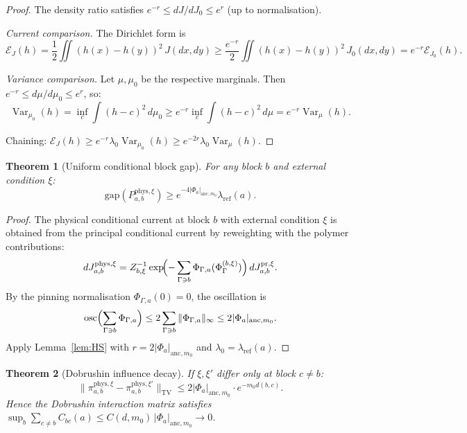 \documentclass[12pt]{article}
\theoremstyle{plain}
\newtheorem{theorem}{Theorem}[section]
\theoremstyle{definition}
\numberwithin{equation}{section}
\newcommand{\Var}{\operatorname{Var}}
\newcommand{\osc}{\operatorname{osc}}
\newcommand{\pr}{\mathrm{pr}}
\newcommand{\phys}{\mathrm{phys}}
\begin{document}
\begin{proof}
The density ratio satisfies $e^{-r}\leq dJ/dJ_0\leq e^r$ (up to normalisation).

\emph{Current comparison.}  The Dirichlet form is
\begin{equation}
\mathcal{E}_J(h) = \frac{1}{2}\iint(h(x)-h(y))^2\,J(dx,dy) \geq \frac{e^{-r}}{2}\iint(h(x)-h(y))^2\,J_0(dx,dy) = e^{-r}\mathcal{E}_{J_0}(h).
\end{equation}

\emph{Variance comparison.}  Let $\mu,\mu_0$ be the respective marginals.  Then $e^{-r}\leq d\mu/d\mu_0\leq e^r$, so:
\begin{equation}
\Var_{\mu_0}(h) = \inf_c\int(h-c)^2\,d\mu_0 \geq e^{-r}\inf_c\int(h-c)^2\,d\mu = e^{-r}\Var_\mu(h).
\end{equation}

Chaining: $\mathcal{E}_J(h)\geq e^{-r}\lambda_0\Var_{\mu_0}(h)\geq e^{-2r}\lambda_0\Var_\mu(h)$.
\end{proof}

\begin{theorem}[Uniform conditional block gap]\label{thm:conditionalgap}
For any block $b$ and external condition $\xi$:
\begin{equation}
\mathrm{gap}(P_{a,b}^{\phys,\xi}) \geq e^{-4|\Phi_a|_{\mathrm{anc},m_0}}\lambda_{\mathrm{ref}}(a).
\end{equation}
\end{theorem}

\begin{proof}
The physical conditional current at block $b$ with external condition $\xi$ is obtained from the principal conditional current by reweighting with the polymer contributions:
\begin{equation}
dJ_{a,b}^{\phys,\xi} = Z_{b,\xi}^{-1}\exp\!\Bigl(-\sum_{\Gamma\ni b}\Phi_{\Gamma,a}(\Phi_\Gamma^{(b,\xi)})\Bigr)\,dJ_{a,b}^{\pr,\xi}.
\end{equation}
By the pinning normalisation $\Phi_{\Gamma,a}(0)=0$, the oscillation is
\begin{equation}
\osc\Bigl(\sum_{\Gamma\ni b}\Phi_{\Gamma,a}\Bigr) \leq 2\sum_{\Gamma\ni b}\|\Phi_{\Gamma,a}\|_\infty \leq 2|\Phi_a|_{\mathrm{anc},m_0}.
\end{equation}
Apply Lemma~\ref{lem:HS} with $r=2|\Phi_a|_{\mathrm{anc},m_0}$ and $\lambda_0=\lambda_{\mathrm{ref}}(a)$.
\end{proof}

\begin{theorem}[Dobrushin influence decay]\label{thm:dobrushin}
If $\xi,\xi'$ differ only at block $c\neq b$:
\begin{equation}
\|\pi_{a,b}^{\phys,\xi}-\pi_{a,b}^{\phys,\xi'}\|_{\mathrm{TV}} \leq 2|\Phi_a|_{\mathrm{anc},m_0}\cdot e^{-m_0 d(b,c)}.
\end{equation}
Hence the Dobrushin interaction matrix satisfies $\sup_b\sum_{c\neq b}C_{bc}(a)\leq C(d,m_0)\,|\Phi_a|_{\mathrm{anc},m_0}\to 0$.
\end{theorem}
\end{document}
